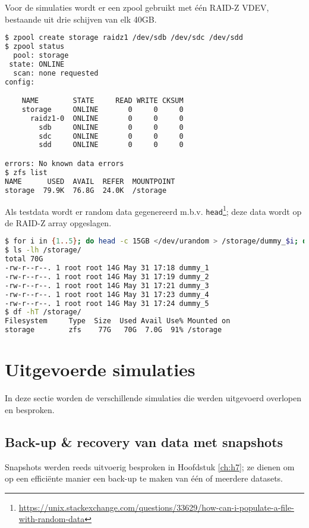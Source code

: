 Voor de simulaties wordt er een zpool gebruikt met één RAID-Z VDEV, bestaande uit drie schijven van elk 40GB.

\begin{lstlisting}[language=bash,style=command_style]
$ zpool create storage raidz1 /dev/sdb /dev/sdc /dev/sdd
$ zpool status
  pool: storage
 state: ONLINE
  scan: none requested
config:

	NAME        STATE     READ WRITE CKSUM
	storage     ONLINE       0     0     0
	  raidz1-0  ONLINE       0     0     0
	    sdb     ONLINE       0     0     0
	    sdc     ONLINE       0     0     0
	    sdd     ONLINE       0     0     0

errors: No known data errors
$ zfs list
NAME      USED  AVAIL  REFER  MOUNTPOINT
storage  79.9K  76.8G  24.0K  /storage
\end{lstlisting}

Als testdata wordt er random data gegenereerd m.b.v. \texttt{head}\footnote{\url{https://unix.stackexchange.com/questions/33629/how-can-i-populate-a-file-with-random-data}}; deze data wordt op de RAID-Z array opgeslagen. 

\begin{lstlisting}[language=bash,style=command_style]
$ for i in {1..5}; do head -c 15GB </dev/urandom > /storage/dummy_$i; done
$ ls -lh /storage/
total 70G
-rw-r--r--. 1 root root 14G May 31 17:18 dummy_1
-rw-r--r--. 1 root root 14G May 31 17:19 dummy_2
-rw-r--r--. 1 root root 14G May 31 17:21 dummy_3
-rw-r--r--. 1 root root 14G May 31 17:23 dummy_4
-rw-r--r--. 1 root root 14G May 31 17:24 dummy_5
$ df -hT /storage/
Filesystem     Type  Size  Used Avail Use% Mounted on
storage        zfs    77G   70G  7.0G  91% /storage
\end{lstlisting}

\clearpage

\section{Uitgevoerde simulaties}

In deze sectie worden de verschillende simulaties die werden uitgevoerd overlopen en besproken.

\subsection{Back-up \& recovery van data met snapshots}

Snapshots werden reeds uitvoerig besproken in Hoofdstuk \ref{ch:h7}; ze dienen om op een efficiënte manier een back-up te maken van één of meerdere datasets. 

